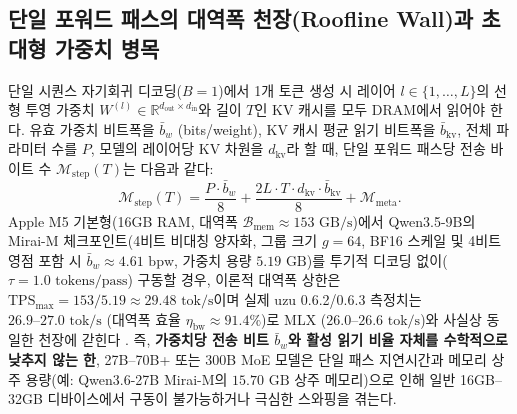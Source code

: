 \documentclass[10pt,a4paper]{article}
\begin{document}
\subsection{단일 포워드 패스의 대역폭 천장(Roofline Wall)과 초대형 가중치 병목}
단일 시퀀스 자기회귀 디코딩($B=1$)에서 1개 토큰 생성 시 레이어 $l \in \{1,\dots,L\}$의 선형 투영 가중치 $W^{(l)} \in \mathbb{R}^{d_{\text{out}} \times d_{\text{in}}}$와 길이 $T$인 KV 캐시를 모두 DRAM에서 읽어야 한다. 유효 가중치 비트폭을 $\bar{b}_w$ (bits/weight), KV 캐시 평균 읽기 비트폭을 $\bar{b}_{\text{kv}}$, 전체 파라미터 수를 $P$, 모델의 레이어당 KV 차원을 $d_{\text{kv}}$라 할 때, 단일 포워드 패스당 전송 바이트 수 $\mathcal{M}_{\text{step}}(T)$는 다음과 같다:
\begin{equation}
\mathcal{M}_{\text{step}}(T) = \frac{P \cdot \bar{b}_w}{8} + \frac{2 L \cdot T \cdot d_{\text{kv}} \cdot \bar{b}_{\text{kv}}}{8} + \mathcal{M}_{\text{meta}}.
\label{eq:memory_step}
\end{equation}
Apple M5 기본형(16GB RAM, 대역폭 $\mathcal{B}_{\text{mem}} \approx 153\text{ GB/s}$)에서 \textsf{Qwen3.5-9B}의 \textsf{Mirai-M} 체크포인트(4비트 비대칭 양자화, 그룹 크기 $g=64$, BF16 스케일 및 4비트 영점 포함 시 $\bar{b}_w \approx 4.61\text{ bpw}$, 가중치 용량 $5.19\text{ GB}$)를 투기적 디코딩 없이($\tau = 1.0\text{ tokens/pass}$) 구동할 경우, 이론적 대역폭 상한은 $\text{TPS}_{\max} = 153 / 5.19 \approx 29.48\text{ tok/s}$이며 실제 \textsf{uzu} 0.6.2/0.6.3 측정치는 $26.9\text{--}27.0\text{ tok/s}$ (대역폭 효율 $\eta_{\text{bw}} \approx 91.4\%$)로 \textsf{MLX} ($26.0\text{--}26.6\text{ tok/s}$)와 사실상 동일한 천장에 갇힌다 \cite{zenn2026uzu}. 즉, \textbf{가중치당 전송 비트 $\bar{b}_w$와 활성 읽기 비율 자체를 수학적으로 낮추지 않는 한}, 27B--70B+ 또는 300B MoE 모델은 단일 패스 지연시간과 메모리 상주 용량(예: \textsf{Qwen3.6-27B Mirai-M}의 $15.70\text{ GB}$ 상주 메모리)으로 인해 일반 16GB--32GB 디바이스에서 구동이 불가능하거나 극심한 스와핑을 겪는다.
\end{document}
